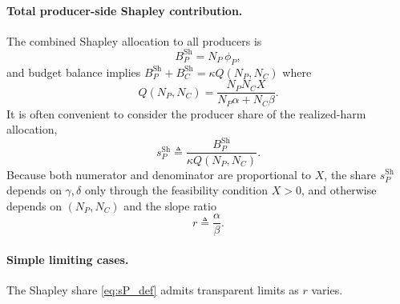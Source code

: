 \documentclass[journal, a4paper]{IEEEtran}
\begin{document}
\paragraph{Total producer-side Shapley contribution.}
The combined Shapley allocation to all producers is
\begin{equation}
B_P^{\mathrm{Sh}}=N_P\,\phi_P,
\label{eq:BPSh_def}
\end{equation}
and budget balance implies $B_P^{\mathrm{Sh}}+B_C^{\mathrm{Sh}}=\kappa Q(N_P,N_C)$ where
\begin{equation}
Q(N_P,N_C)=\frac{N_PN_CX}{N_P\alpha+N_C\beta}.
\label{eq:Q_grand}
\end{equation}
It is often convenient to consider the producer share of the realized-harm allocation,
\begin{equation}
s_P^{\mathrm{Sh}}
\triangleq
\frac{B_P^{\mathrm{Sh}}}{\kappa Q(N_P,N_C)}.
\label{eq:sP_def}
\end{equation}
Because both numerator and denominator are proportional to $X$, the share $s_P^{\mathrm{Sh}}$ depends on $\gamma,\delta$ only through the feasibility condition $X>0$, and otherwise depends on $(N_P,N_C)$ and the slope ratio
\begin{equation}
r\triangleq \frac{\alpha}{\beta}.
\label{eq:r_def}
\end{equation}

\paragraph{Simple limiting cases.}
The Shapley share \eqref{eq:sP_def} admits transparent limits as $r$ varies.
\end{document}
